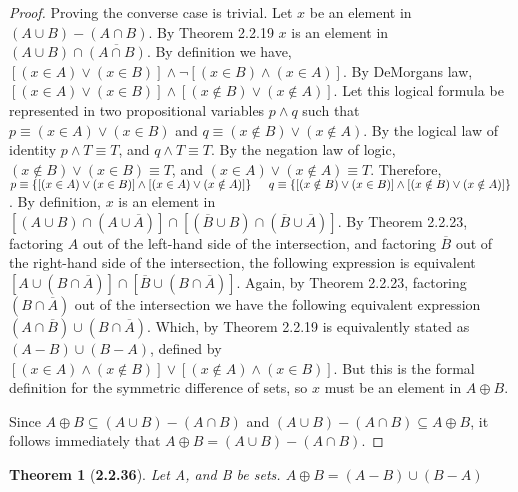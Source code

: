 \documentclass[a4paper, 12pt]{article}
\theoremstyle{plain}
\newtheorem*{theorem*}{Theorem}
\begin{document}
\begin{proof}
    Proving the converse case is trivial. Let $x$ be an element in \newline 
    $(A \cup B) - (A \cap B)$. By Theorem 2.2.19 $x$ is an element in 
    $(A \cup B) \cap \overline{(A \cap B)}$. By definition we have, 
    $[(x \in A) \lor (x \in B)] \land \lnot [(x \in B) \land (x \in A)]$. By DeMorgans law, 
    $[(x \in A) \lor (x \in B)] \land [(x \notin B) \lor (x \notin A)]$. Let this logical formula 
    be represented in two propositional variables $p \land q$ such that 
    $p \equiv (x \in A) \lor (x \in B)$ and $q \equiv (x \notin B) \lor (x \notin A)$. By the 
    logical law of identity $p \land T \equiv T$, and $q \land T \equiv T$. By the negation law 
    of logic, $(x \notin B) \lor (x \in B) \equiv T$, and $(x \in A) \lor (x \notin A) \equiv T$. 
    Therefore, \newline \indent 
    $p \equiv \{[(x \in A) \lor (x \in B)] \land [(x \in A) \lor (x \notin A)]\} 
    \newline \indent q \equiv \{[(x \notin B) \lor (x \in B)] \land 
    [(x \notin B) \lor (x \notin A)]\}$. 
    \newline By definition, $x$ is an element in 
    $[(A \cup B) \cap (A \cup \overline{A})] \cap 
    [(\overline{B} \cup B) \cap (\overline{B} \cup \overline{A})]$. By Theorem 2.2.23, 
    factoring $A$ out of the left-hand side of the intersection, and factoring $\overline{B}$ 
    out of the right-hand side of the intersection, the following expression is equivalent 
    $[A \cup (B \cap \overline{A})] \cap [\overline{B} \cup (B \cap \overline{A})]$. Again, by 
    Theorem 2.2.23, factoring $(B \cap \overline{A})$ out of the intersection we have the following 
    equivalent expression $(A \cap \overline{B}) \cup (B \cap \overline{A})$. Which, by 
    Theorem 2.2.19 is equivalently stated as $(A - B) \cup (B - A)$, defined by 
    $[(x \in A) \land (x \notin B)] \lor [(x \notin A) \land (x \in B)]$. But this is the formal 
    definition for the symmetric difference of sets, so $x$ must be an element in $A \oplus B$.
    
    Since $A \oplus B \subseteq (A \cup B) - (A \cap B)$ and 
    $(A \cup B) - (A \cap B) \subseteq A \oplus B$, it follows immediately that 
    $A \oplus B = (A \cup B) - (A \cap B)$.
\end{proof}

\pagebreak


\begin{theorem*}[\textbf{2.2.36}]
    Let A, and B be sets. $A \oplus B = (A - B) \cup (B - A)$
\end{theorem*}
\end{document}
